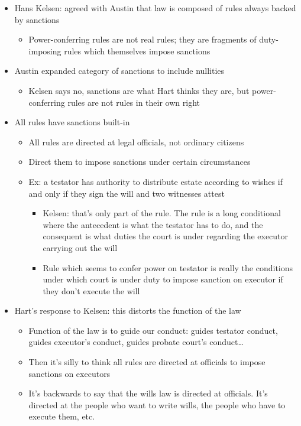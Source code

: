 \begin{itemize}
\tightlist
\item
  Hans Kelsen: agreed with Austin that law is composed of rules always
  backed by sanctions

  \begin{itemize}
  \tightlist
  \item
    Power-conferring rules are not real rules; they are fragments of
    duty-imposing rules which themselves impose sanctions
  \end{itemize}
\item
  Austin expanded category of sanctions to include nullities

  \begin{itemize}
  \tightlist
  \item
    Kelsen says no, sanctions are what Hart thinks they are, but
    power-conferring rules are not rules in their own right
  \end{itemize}
\item
  All rules have sanctions built-in

  \begin{itemize}
  \tightlist
  \item
    All rules are directed at legal officials, not ordinary citizens
  \item
    Direct them to impose sanctions under certain circumstances
  \item
    Ex: a testator has authority to distribute estate according to
    wishes if and only if they sign the will and two witnesses attest

    \begin{itemize}
    \tightlist
    \item
      Kelsen: that's only part of the rule. The rule is a long
      conditional where the antecedent is what the testator has to do,
      and the consequent is what duties the court is under regarding the
      executor carrying out the will
    \item
      Rule which seems to confer power on testator is really the
      conditions under which court is under duty to impose sanction on
      executor if they don't execute the will
    \end{itemize}
  \end{itemize}
\item
  Hart's response to Kelsen: this distorts the function of the law

  \begin{itemize}
  \tightlist
  \item
    Function of the law is to guide our conduct: guides testator
    conduct, guides executor's conduct, guides probate court's
    conduct\ldots{}
  \item
    Then it's silly to think all rules are directed at officials to
    impose sanctions on executors
  \item
    It's backwards to say that the wills law is directed at officials.
    It's directed at the people who want to write wills, the people who
    have to execute them, etc.
  \end{itemize}
\end{itemize}


